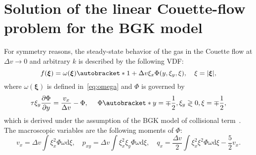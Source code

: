 \documentclass{elsarticle} %
\newcommand{\dd}{\mathrm{d}}
\newcommand{\pder}[2][]{\frac{\partial#1}{\partial#2}}
\DeclarePairedDelimiter\autobracket()       %
\newcommand{\br}[1]{\autobracket*{#1}}
\newcommand{\bxi}{\boldsymbol{\xi}}
\begin{document}
\section{Solution of the linear Couette-flow problem for the BGK model}\label{sec:benchmark_solution}

For symmetry reasons, the steady-state behavior of the gas in the Couette flow at \(\Delta{v}\to0\)
and arbitrary \(k\) is described by the following VDF:
\begin{equation}\label{eq:exact:vdf}
    f(\bxi) = \omega(\bxi)\br{ 1 + \Delta{v}\xi_x \Phi(y, \xi_y, \xi) }, \quad \xi = |\bxi|,
\end{equation}
where \(\omega(\bxi)\) is defined in~\eqref{eq:omega} and \(\Phi\) is governed by
\begin{equation}\label{eq:exact:Phi}
    \tau\xi_y\pder[\Phi]{y} = \frac{v_x}{\Delta{v}} - \Phi, \quad\
    \Phi\br{ y=\mp\frac12, \xi_y\gtrless0, \xi } = \mp\frac12,
\end{equation}
which is derived under the assumption of the BGK model of collisional term~\cite{Sone2007}.
The macroscopic variables are the following moments of \(\Phi\):
\begin{equation}\label{eq:exact:macro}
    v_x = \Delta{v}\int \xi_x^2\Phi\omega\dd\xi, \quad
    p_{xy} = \Delta{v}\int \xi_x^2\xi_y\Phi\omega\dd\xi, \quad
    q_x = \frac{\Delta{v}}2 \int \xi_x^2\xi^2\Phi\omega\dd\xi - \frac52v_x.
\end{equation}
\end{document}
